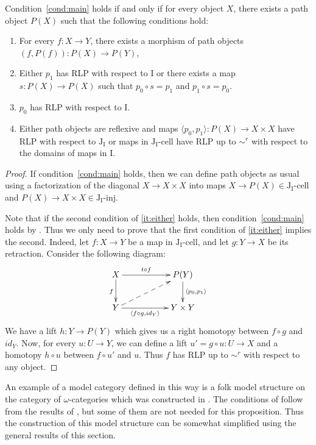 \documentclass[reqno]{amsart}
\theoremstyle{definition}
\newcommand{\I}{\mathrm{I}}
\newcommand{\J}{\mathrm{J}}
\newcommand{\class}[2]{#1\text{-}\mathrm{#2}}
\newcommand{\Iinj}[1][\I]{\class{#1}{inj}}
\newcommand{\Icell}[1][\I]{\class{#1}{cell}}
\newcommand{\Jinj}[1][]{\Iinj[\J#1]}
\newcommand{\Jcell}[1][]{\Icell[\J#1]}
\begin{document}
\begin{prop}
Condition~\eqref{cond:main} holds if and only if for every object $X$,
there exists a path object $P(X)$ such that the following conditions hold:
\begin{enumerate}
\item For every $f : X \to Y$, there exists a morphism of path objects $(f,P(f)) : P(X) \to P(Y)$,
\item Either $p_1$ has RLP with respect to $\I$ or there exists a map $s : P(X) \to P(X)$ such that $p_0 \circ s = p_1$ and $p_1 \circ s = p_0$.
\item $p_0$ has RLP with respect to $\I$.
\item \label{it:either} Either path objects are reflexive and maps $\langle p_0, p_1 \rangle : P(X) \to X \times X$ have RLP with respect to $\J_\I$
or maps in $\Jcell[_\I]$ have RLP up to $\sim^r$ with respect to the domains of maps in $\I$.
\end{enumerate}
\end{prop}
\begin{proof}
If condition~\eqref{cond:main} holds, then we can define path objects as usual using a factorization
of the diagonal $X \to X \times X$ into maps $X \to P(X) \in \Jcell[_\I]$ and $P(X) \to X \times X \in \Jinj[_\I]$.

Note that if the second condition of \eqref{it:either} holds, then condition~\eqref{cond:main} holds by .
Thus we only need to prove that the first condition of \eqref{it:either} implies the second.
Indeed, let $f : X \to Y$ be a map in $\Jcell[_\I]$, and let $g : Y \to X$ be its retraction.
Consider the following diagram:
\[ \xymatrix{ X \ar[rr]^-{t \circ f} \ar[d]_f & & P(Y) \ar[d]^{\langle p_0, p_1 \rangle} \\
              Y \ar[rr]_-{\langle f \circ g, id_Y \rangle} \ar@{-->}[urr] & & Y \times Y
            } \]
We have a lift $h : Y \to P(Y)$ which gives us a right homotopy between $f \circ g$ and $id_Y$.
Now, for every $u : U \to Y$, we can define a lift $u' = g \circ u : U \to X$ and a homotopy $h \circ u$ between $f \circ u'$ and $u$.
Thus $f$ has RLP up to $\sim^r$ with respect to any object.
\end{proof}

\begin{example}
An example of a model category defined in this way is a folk model structure on the category of $\omega$-categories which was constructed in \cite{folk}.
The conditions of  follow from the results of \cite{folk}, but some of them are not needed for this proposition.
Thus the construction of this model structure can be somewhat simplified using the general results of this section.
\end{example}
\end{document}
